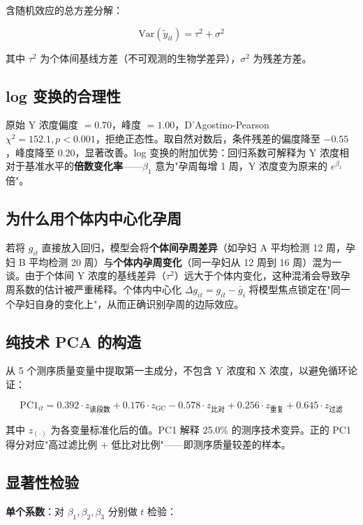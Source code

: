 \documentclass{internal-report}
\begin{document}
含随机效应的总方差分解：

$$
\text{Var}(\tilde{y}_{it}) = \tau^2 + \sigma^2
$$

其中 $\tau^2$ 为个体间基线方差（不可观测的生物学差异），$\sigma^2$ 为残差方差。

\subsection{log 变换的合理性}

原始 Y 浓度偏度 $=0.70$，峰度 $=1.00$，D'Agostino-Pearson $\chi^2 = 152.1, p < 0.001$，拒绝正态性。取自然对数后，条件残差的偏度降至 $-0.55$，峰度降至 $0.20$，显著改善。log 变换的附加优势：回归系数可解释为 Y 浓度相对于基准水平的\textbf{倍数变化率}——$\beta_1$ 意为"孕周每增 1 周，Y 浓度变为原来的 $e^{\beta_1}$ 倍"。

\subsection{为什么用个体内中心化孕周}

若将 $g_{it}$ 直接放入回归，模型会将\textbf{个体间孕周差异}（如孕妇 A 平均检测 12 周，孕妇 B 平均检测 20 周）与\textbf{个体内孕周变化}（同一孕妇从 12 周到 16 周）混为一谈。由于个体间 Y 浓度的基线差异（$\tau^2$）远大于个体内变化，这种混淆会导致孕周系数的估计被严重稀释。个体内中心化 $\Delta g_{it} = g_{it} - \bar{g}_i$ 将模型焦点锁定在"同一个孕妇自身的变化上"，从而正确识别孕周的边际效应。

\subsection{纯技术 PCA 的构造}

从 5 个测序质量变量中提取第一主成分，不包含 Y 浓度和 X 浓度，以避免循环论证：

$$
\text{PC1}_{it} = 0.392 \cdot z_{\text{读段数}} + 0.176 \cdot z_{\text{GC}} - 0.578 \cdot z_{\text{比对}} + 0.256 \cdot z_{\text{重复}} + 0.645 \cdot z_{\text{过滤}}
$$

其中 $z_{(\cdot)}$ 为各变量标准化后的值。PC1 解释 25.0\% 的测序技术变异。正的 PC1 得分对应"高过滤比例 + 低比对比例"——即测序质量较差的样本。

\subsection{显著性检验}

\textbf{单个系数}：对 $\beta_1, \beta_2, \beta_3$ 分别做 $t$ 检验：
\end{document}
